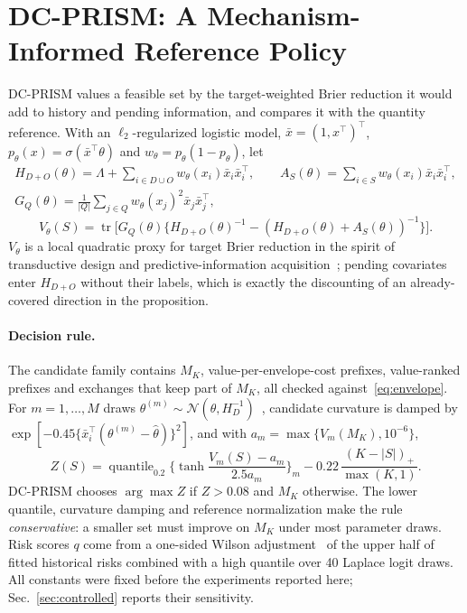 \documentclass[runningheads]{llncs}
\begin{document}
\section{DC-PRISM: A Mechanism-Informed Reference Policy}
\label{sec:policy}
DC-PRISM values a feasible set by the target-weighted Brier reduction it would add to history and pending information, and compares it with the quantity reference. With an $\ell_2$-regularized logistic model, $\bar x=(1,x^\top)^\top$, $p_\theta(x)=\sigma(\bar x^\top\theta)$ and $w_\theta=p_\theta(1-p_\theta)$, let
\begin{gather*}
 H_{D+O}(\theta)=\Lambda+\!\!\sum_{i\in D\cup O}\!\!w_\theta(x_i)\bar x_i\bar x_i^\top,\qquad
 A_S(\theta)=\sum_{i\in S}w_\theta(x_i)\bar x_i\bar x_i^\top,\\
 G_Q(\theta)=\tfrac1{|Q|}\sum_{j\in Q}w_\theta(x_j)^2\bar x_j\bar x_j^\top,
\end{gather*}
\begin{equation}
 V_\theta(S)=\operatorname{tr}\!\big[G_Q(\theta)\{H_{D+O}(\theta)^{-1}-(H_{D+O}(\theta)+A_S(\theta))^{-1}\}\big].\label{eq:value}
\end{equation}
$V_\theta$ is a local quadratic proxy for target Brier reduction in the spirit of transductive design and predictive-information acquisition~\cite{yu2006transductive,bickfordsmith2023prediction}; pending covariates enter $H_{D+O}$ without their labels, which is exactly the discounting of an already-covered direction in the proposition.

\paragraph{Decision rule.} The candidate family contains $M_K$, value-per-envelope-cost prefixes, value-ranked prefixes and exchanges that keep part of $M_K$, all checked against~\eqref{eq:envelope}. For $m=1,\dots,M$ draws $\theta^{(m)}\sim\mathcal N(\widehat\theta,H_D^{-1})$~\cite{mackay1992practical}, candidate curvature is damped by $\exp[-0.45\{\bar x_i^\top(\theta^{(m)}-\widehat\theta)\}^2]$, and with $a_m=\max\{V_m(M_K),10^{-6}\}$,
\begin{equation}
 Z(S)=\operatorname{quantile}_{0.2}\Big\{\tanh\frac{V_m(S)-a_m}{2.5a_m}\Big\}_m-0.22\,\frac{(K-|S|)_+}{\max(K,1)} .\label{eq:score}
\end{equation}
DC-PRISM chooses $\arg\max Z$ if $Z>0.08$ and $M_K$ otherwise. The lower quantile, curvature damping and reference normalization make the rule \emph{conservative}: a smaller set must improve on $M_K$ under most parameter draws. Risk scores $q$ come from a one-sided Wilson adjustment~\cite{wilson1927probable} of the upper half of fitted historical risks combined with a high quantile over 40 Laplace logit draws. All constants were fixed before the experiments reported here; Sec.~\ref{sec:controlled} reports their sensitivity.
\end{document}
